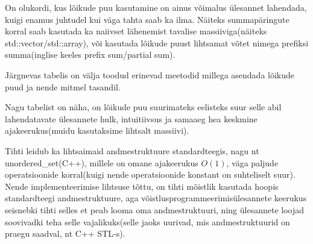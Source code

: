 \documentclass{trkut}
\begin{document}
\parencite{AC}

On olukordi, kus lõikude puu kasutamine on ainus võimalus ülesannet lahendada, kuigi enamus juhtudel kui väga tahta saab ka ilma.
Näiteks summapäringute korral saab kasutada ka naiivset lähenemist tavalise massiiviga(näiteks  std::vector/std::array), või kasutada lõikude puust lihtsamat võtet nimega prefiksi summa(inglise keeles prefix sum/partial sum).

Järgnevas tabelis on välja toodud erinevad meetodid millega asendada lõikude puud ja nende mitmel tasandil.
\begin{table}[H]
\caption{Lõikude puu asendamine}%
\label{tabel1}%
\end{table}


Nagu tabelist on näha, on lõikude puu suurimateks eelisteks suur selle abil lahendatavate ülesannete hulk, intuitiivsus ja samaaeg hea keskmine ajakeerukus(muidu kasutaksime lihtsalt massiivi).

Tihti leidub ka lihtsaimaid andmestruktuure standardteegis, nagu nt unordered\_set(C++), millele on omane ajakeerukus $O(1)$, väga paljude operatsioonide korral(kuigi nende operatsioonide konstant on suhteliselt suur). 
Nende implementeerimise lihtsuse tõttu, on tihti mõistlik kasutada hoopis standardteegi andmestruktuure, aga võistlusprogrammeerimisülesannete keerukus seisnebki tihti selles et peab looma oma andmestruktuuri, ning ülesannete loojad soovivadki teha selle vajalikuks(selle jaoks uurivad, mis andmestruktuurid on praegu saadval, nt C++ STL-s).
\end{document}
